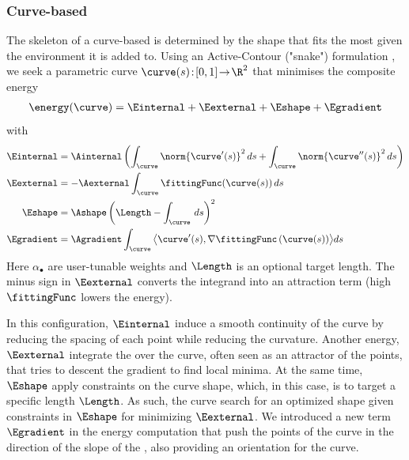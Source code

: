 \subsubsection{Curve-based }
The skeleton of a curve-based  is determined by the shape that fits the most given the environment it is added to. 
Using an Active-Contour ("snake") formulation \cite{Kass1988}, we seek a parametric curve $\curve(s)\!:\![0,1]\!\to\!\R^{2}$ that minimises the composite energy  
\begin{align}
    \energy(\curve) = \Einternal + \Eexternal + \Eshape + \Egradient
\end{align}
with
\begin{align}
    \label{eq:env-obj_snake-energy-equation-internal}
    \Einternal &= \Ainternal \left( \int_{\curve}{ \norm{\curve'(s)}^2 \, ds} + \int_{\curve}{ \norm{\curve''(s)}^2 \, ds}  \right) \\
    \label{eq:env-obj_snake-energy-equation-external}
    \Eexternal &= -\Aexternal \int_{\curve}{ \fittingFunc(\curve(s)) \, ds } \\
    \label{eq:env-obj_snake-energy-equation-shape}
    \Eshape    &= \Ashape \left( \Length - \int_{\curve}{ \, ds } \right)^2 \\
    \label{eq:env-obj_snake-energy-equation-gradient}
    \Egradient &= \Agradient \int_{\curve}{\bigl\langle \curve'(s),\nabla\fittingFunc\left(\curve(s)\right)\bigr\rangle ds}
\end{align}
Here $\alpha_{\bullet}$ are user-tunable weights and $\Length$ is an optional target length. The minus sign in $\Eexternal$ converts the integrand into an attraction term (high $\fittingFunc$ lowers the energy).

In this configuration, $\Einternal$ induce a smooth continuity of the curve by reducing the spacing of each point while reducing the curvature. Another energy, $\Eexternal$ integrate the  over the curve, often seen as an attractor of the points, that tries to descent the gradient to find local minima. At the same time, $\Eshape$ apply constraints on the curve shape, which, in this case, is to target a specific length $\Length$. As such, the curve search for an optimized shape given constraints in $\Eshape$ for minimizing $\Eexternal$. We introduced a new term $\Egradient$ in the energy computation that push the points of the curve in the direction of the slope of the , also providing an orientation for the curve.

